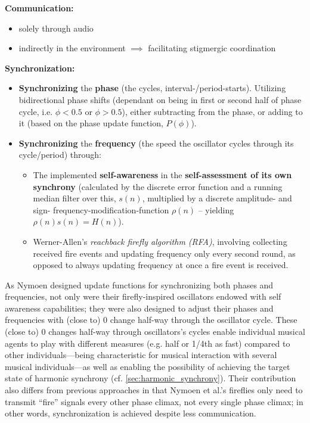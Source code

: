 \textbf{Communication:}
\begin{itemize}
    \item solely through audio
    \item indirectly in the environment $\implies$ facilitating stigmergic coordination
\end{itemize}

\textbf{Synchronization:}
\begin{itemize}
    \item \textbf{Synchronizing} the \textbf{phase} (the cycles, interval-/period-starts). Utilizing bidirectional phase shifts (dependant on being in first or second half of phase cycle, i.e. $\phi < 0.5$ or $\phi > 0.5$), either subtracting from the phase, or adding to it (based on the phase update function, $P(\phi)$).
    \item \textbf{Synchronizing} the \textbf{frequency} (the speed the oscillator cycles through its cycle/period) through:
    \begin{itemize}
        \item The implemented \textbf{self-awareness} in the \textbf{self-assessment of its own synchrony} (calculated by the discrete error function and a running median filter over this, $s(n)$, multiplied by a discrete amplitude- and sign- frequency-modification-function $\rho(n)$ -- yielding $\rho(n)s(n) = H(n)$).
        \item Werner-Allen's \textit{reachback firefly algorithm (RFA)}, involving collecting received fire events and updating frequency only every second round, as opposed to always updating frequency at once a fire event is received.
    \end{itemize}
\end{itemize}


As Nymoen designed update functions for synchronizing both phases and frequencies, not only were their firefly-inspired oscillators endowed with self awareness capabilities; they were also designed to adjust their phases and frequencies with (close to) 0 change half-way through the oscillator cycle. These (close to) 0 changes half-way through oscillators's cycles enable individual musical agents to play with different measures (e.g. half or 1/4th as fast) compared to other individuals—being characteristic for musical interaction with several musical individuals—as well as enabling the possibility of achieving the target state of harmonic synchrony (cf. \ref{sec:harmonic_synchrony}). Their contribution also differs from previous approaches in that Nymoen et al.'s fireflies only need to transmit ``fire'' signals every other phase climax, not every single phase climax; in other words, synchronization is achieved despite less communication.

